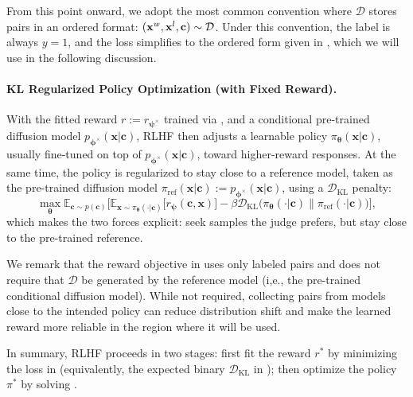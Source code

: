 From this point onward, we adopt the most common convention where $\mathcal D$ stores pairs in an ordered format: $({\mathbf{x}}^w, {\mathbf{x}}^l, {\mathbf{c}}) \sim \mathcal D$. Under this convention, the label is always $y=1$, and the loss simplifies to the ordered form given in , which we will use in the following discussion.

\paragraph{KL Regularized Policy Optimization (with Fixed Reward).}
With the fitted reward $r:=r_{\bm\psi^\times}$ trained via , and a conditional pre-trained diffusion model $p_{\bm{\phi}^\times}(\mathbf x|\mathbf c)$, RLHF then adjusts a learnable policy $\pi_{\bm\theta}(\mathbf x|\mathbf c)$, usually fine-tuned on top of $p_{\bm{\phi}^\times}(\mathbf x|\mathbf c)$, toward higher-reward responses.  
At the same time, the policy is regularized to stay close to a reference model, taken as the pre-trained diffusion model $\pi_{\mathrm{ref}}(\mathbf x|\mathbf c):=p_{\bm{\phi}^\times}(\mathbf x|\mathbf c)$, using a $\mathcal{D}_{\mathrm{KL}}$ penalty:
\begin{equation}\label{eq:rlhf-policy-correct}
\max_{\bm\theta} 
\mathbb E_{\mathbf c\sim p(\mathbf c)}
\Big[
\mathbb E_{\mathbf x\sim \pi_{\bm\theta}(\cdot|\mathbf c)}\big[r_{\bm\psi}(\mathbf c,\mathbf x)\big]
-\beta \mathcal{D}_{\mathrm{KL}} \big(\pi_{\bm\theta}(\cdot|\mathbf c) \big\| \pi_{\mathrm{ref}}(\cdot|\mathbf c)\big)
\Big],
\end{equation}
which makes the two forces explicit: seek samples the judge prefers, but stay close to the pre-trained reference.

We remark that the reward objective in  uses only labeled pairs and does not require that $\mathcal D$ be generated by the reference model (i,e., the pre-trained conditional diffusion model). While not required, collecting pairs from models close to the intended policy can reduce distribution shift and make the learned reward more reliable in the region where it will be used.

In summary, RLHF proceeds in two stages: first fit the reward $r^*$ by minimizing the loss in  (equivalently, the expected binary $\mathcal{D}_{\mathrm{KL}}$ in ); then optimize the policy $\pi^*$ by solving .


\newpage



